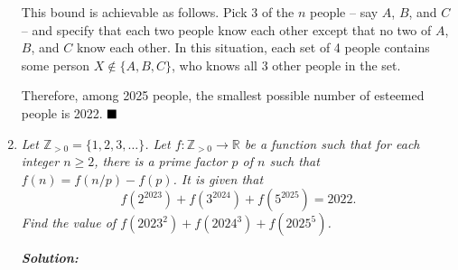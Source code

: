 \documentclass[12pt]{article}
\newcommand{\sol}{\textbf{\textit{Solution: }}}
\begin{document}
\begin{enumerate}[topsep=2\bigskipamount,itemsep=\bigskipamount]
This bound is achievable as follows. Pick 3 of the $n$ people -- say $A$, $B$, and $C$ -- and specify that each two people know each other except that no two of $A$, $B$, and $C$ know each other. In this situation, each set of 4 people contains some person $X \notin \{A,B,C\}$, who knows all 3 other people in the set.

Therefore, among 2025 people, the smallest possible number of esteemed people is 2022. $\hfill\blacksquare$

\item \textit{Let \(\mathbb{Z}_{> 0} = \{1, 2, 3, \ldots\}\). Let \(f: \mathbb{Z}_{> 0} \rightarrow \mathbb{R}\) be a function such that for each integer \(n \geqslant 2\), there is a prime factor \(p\) of \(n\) such that \(f(n) = f(n/p) - f(p)\). It is given that
\[f(2^{2023}) + f(3^{2024}) + f(5^{2025}) = 2022.\]
Find the value of \(f(2023^{2}) + f(2024^{3}) + f(2025^{5})\).}

\sol


\end{enumerate}
\end{document}
